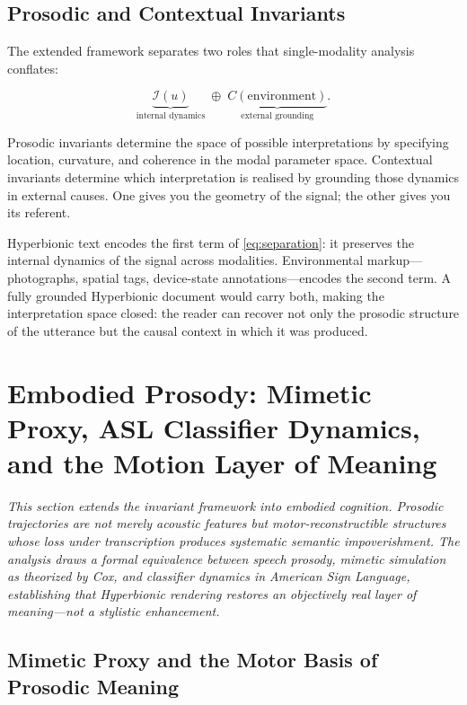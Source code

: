 \documentclass[12pt, a4paper]{article}
\begin{document}
\subsection{Prosodic and Contextual Invariants}

The extended framework separates two roles that single-modality analysis conflates:

\begin{equation}
\underbrace{\mathcal{I}(u)}_{\text{internal dynamics}} \;\oplus\; \underbrace{C(\text{environment})}_{\text{external grounding}}.
\label{eq:separation}
\end{equation}

Prosodic invariants determine the space of possible interpretations by specifying location, curvature, and coherence in the modal parameter space. Contextual invariants determine which interpretation is realised by grounding those dynamics in external causes. One gives you the geometry of the signal; the other gives you its referent.

Hyperbionic text encodes the first term of \eqref{eq:separation}: it preserves the internal dynamics of the signal across modalities. Environmental markup---photographs, spatial tags, device-state annotations---encodes the second term. A fully grounded Hyperbionic document would carry both, making the interpretation space closed: the reader can recover not only the prosodic structure of the utterance but the causal context in which it was produced.


\section{Embodied Prosody: Mimetic Proxy, ASL Classifier Dynamics, and the Motion Layer of Meaning}

\noindent\textit{This section extends the invariant framework into embodied cognition. Prosodic trajectories are not merely acoustic features but motor-reconstructible structures whose loss under transcription produces systematic semantic impoverishment. The analysis draws a formal equivalence between speech prosody, mimetic simulation as theorized by Cox, and classifier dynamics in American Sign Language, establishing that Hyperbionic rendering restores an objectively real layer of meaning---not a stylistic enhancement.}

\subsection{Mimetic Proxy and the Motor Basis of Prosodic Meaning}
\end{document}
